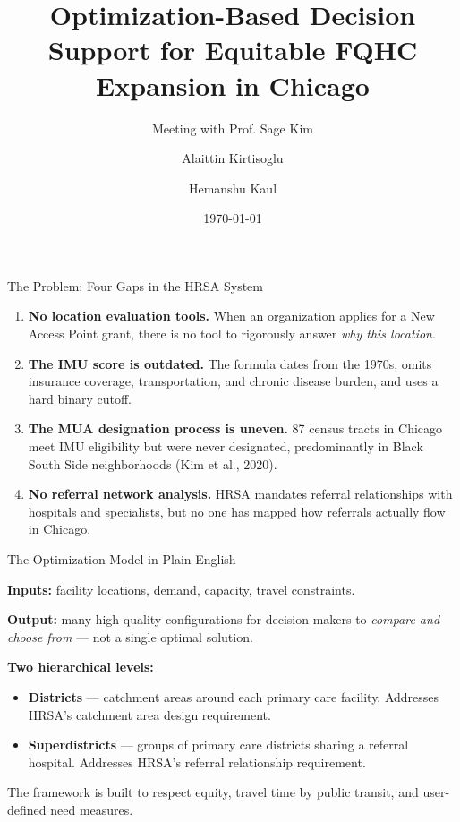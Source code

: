 \documentclass[aspectratio=169]{beamer}
\title{Optimization-Based Decision Support for Equitable FQHC Expansion in Chicago}
\subtitle{Meeting with Prof. Sage Kim}
\author{Alaittin Kirtisoglu \and Hemanshu Kaul}
\institute{Department of Applied Mathematics \\ Illinois Institute of Technology}
\date{\today}
\begin{document}
\maketitle

\begin{frame}{The Problem: Four Gaps in the HRSA System}

\begin{enumerate}
  \item<1-> \textbf{No location evaluation tools.} When an organization applies
        for a New Access Point grant, there is no tool to rigorously answer
        \emph{why this location}.

  \item<2-> \textbf{The IMU score is outdated.} The formula dates from the
        1970s, omits insurance coverage, transportation, and chronic disease
        burden, and uses a hard binary cutoff.

  \item<3-> \textbf{The MUA designation process is uneven.} 87 census tracts in
        Chicago meet IMU eligibility but were never designated, predominantly in
        Black South Side neighborhoods (Kim et al., 2020).

  \item<4-> \textbf{No referral network analysis.} HRSA mandates referral
        relationships with hospitals and specialists, but no one has mapped how
        referrals actually flow in Chicago.
\end{enumerate}

\end{frame}

\begin{frame}{The Optimization Model in Plain English}

\textbf{Inputs:} facility locations, demand, capacity, travel constraints.

\medskip
\textbf{Output:} many high-quality configurations for decision-makers to
\emph{compare and choose from} --- not a single optimal solution.

\bigskip
\textbf{Two hierarchical levels:}

\begin{itemize}
  \item \textbf{Districts} --- catchment areas around each primary care
        facility. Addresses HRSA's catchment area design requirement.
  \item \textbf{Superdistricts} --- groups of primary care districts sharing a
        referral hospital. Addresses HRSA's referral relationship requirement.
\end{itemize}

\bigskip
The framework is built to respect equity, travel time by public transit, and
user-defined need measures.

\end{frame}
\end{document}
